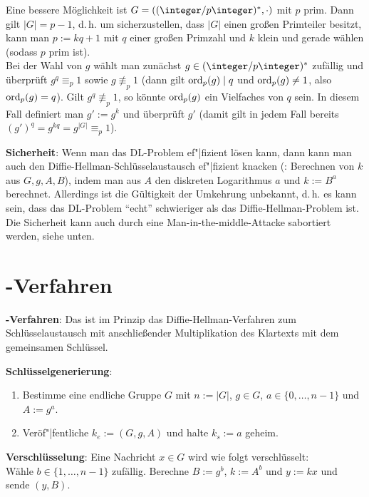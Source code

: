 Eine bessere Möglichkeit ist $G = ((\ZpZ)^\ast, \cdot)$ mit $p$ prim.
Dann gilt $|G| = p - 1$,
d.\,h. um sicherzustellen, dass $|G|$ einen großen Primteiler besitzt, kann man
$p := kq + 1$ mit $q$ einer großen Primzahl und $k$ klein und gerade wählen
(sodass $p$ prim ist).\\
Bei der Wahl von $g$ wählt man zunächst $g \in (\ZpZ)^\ast$ zufällig und überprüft
$g^q \equiv_p 1$ sowie $g \not\equiv_p 1$
(dann gilt $\operatorname{ord}_p(g) \mid q$ und $\operatorname{ord}_p(g) \not= 1$, also $\operatorname{ord}_p(g) = q$).
Gilt $g^q \not\equiv_p 1$, so könnte $\operatorname{ord}_p(g)$ ein Vielfaches von $q$ sein.
In diesem Fall definiert man $g' := g^k$ und überprüft $g'$
(damit gilt in jedem Fall bereits $(g')^q = g^{kq} = g^{|G|} \equiv_p 1$).

\linie

\textbf{Sicherheit}:
Wenn man das DL-Problem ef"|fizient lösen kann, dann kann man auch den
Diffie-Hellman-Schlüsselaustausch ef"|fizient knacken
(: Berechnen von $k$ aus $G, g, A, B$),
indem man aus $A$ den diskreten Logarithmus $a$ und $k := B^a$ berechnet.
Allerdings ist die Gültigkeit der Umkehrung unbekannt,
d.\,h. es kann sein, dass das DL-Problem "`echt"' schwieriger als das Diffie-Hellman-Problem ist.
Die Sicherheit kann auch durch eine Man-in-the-middle-Attacke sabortiert werden, siehe unten.

\pagebreak

\section{%
    -Verfahren%
}

\textbf{-Verfahren}:
Das  ist im Prinzip das Diffie-Hellman-Verfahren zum
Schlüsselaustausch mit anschließender Multiplikation des Klartexts mit dem gemeinsamen Schlüssel.

\textbf{Schlüsselgenerierung}:
\begin{enumerate}
    \item
    Bestimme eine endliche Gruppe $G$ mit $n := |G|$, $g \in G$, $a \in \{0, \dotsc, n - 1\}$
    und $A := g^a$.

    \item
    Veröf"|fentliche $k_e := (G, g, A)$ und halte $k_s := a$ geheim.
\end{enumerate}

\textbf{Verschlüsselung}:
Eine Nachricht $x \in G$ wird wie folgt verschlüsselt:\\
Wähle $b \in \{1, \dotsc, n - 1\}$ zufällig.
Berechne $B := g^b$, $k := A^b$ und $y := kx$ und sende $(y, B)$.


